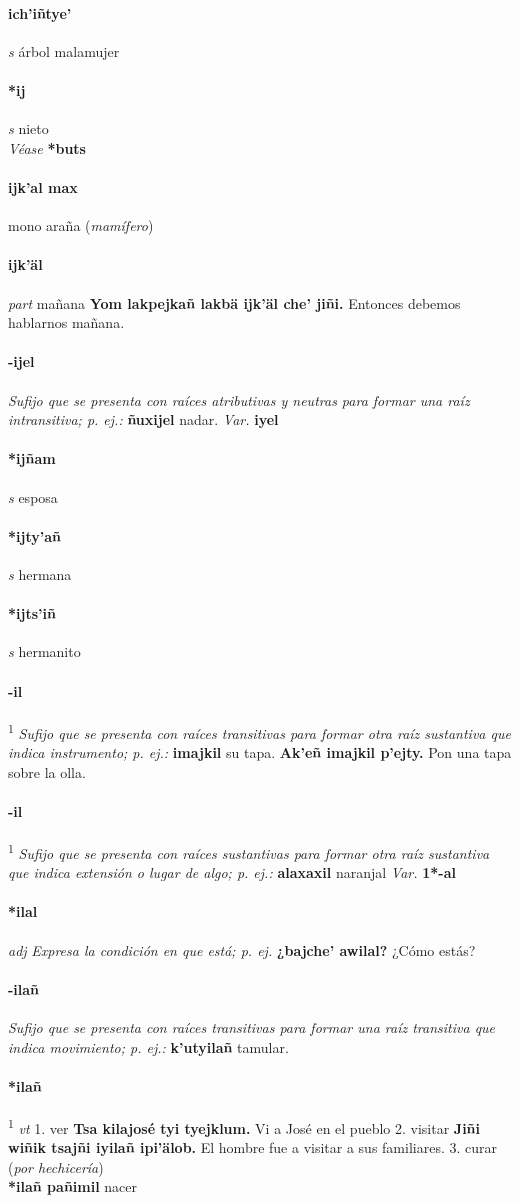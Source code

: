 \documentclass{scrbook}
\newcommand{\entry}[1]{\paragraph{#1}}
\newcommand{\onedefinition}[1]{#1.}
\newcommand{\defsuperscript}[1]{\textsuperscript{1}}
\newcommand{\nontranslationdef}[1]{\textit{#1}}
\newcommand{\partofspeech}[1]{\textit{#1}}
\newcommand{\spanishtranslation}[1]{#1}
\newcommand{\clarification}[1]{(\textit{#1})}
\newcommand{\cholexample}[1]{\textbf{#1}}
\newcommand{\exampletranslation}[1]{#1}
\newcommand{\alsosee}[1]{\\\textit{Véase} \textbf{#1}}
\newcommand{\secondaryentry}[1]{\\\textbf{#1}}
\newcommand{\secondtranslation}[1]{#1}
\newcommand{\variation}[1]{\textit{Var.} \textbf{#1}}
\begin{document}
\begin{multicols}{2}
\entry{ich'iñtye'}
\partofspeech{s}
\spanishtranslation{árbol malamujer}

\entry{*ij}
\partofspeech{s}
\spanishtranslation{nieto}
\alsosee{*buts}

\entry{ijk'al max}
\spanishtranslation{mono araña}
\clarification{mamífero}

\entry{ijk'äl}
\partofspeech{part}
\spanishtranslation{mañana}
\cholexample{Yom lakpejkañ lakbä ijk'äl che' jiñi.}
\exampletranslation{Entonces debemos hablarnos mañana.}

\entry{-ijel}
\nontranslationdef{Sufijo que se presenta con raíces atributivas y neutras para formar una raíz intransitiva; p. ej.:}
\cholexample{ñuxijel}
\exampletranslation{nadar.}
\variation{iyel}

\entry{*ijñam}
\partofspeech{s}
\spanishtranslation{esposa}

\entry{*ijty'añ}
\partofspeech{s}
\spanishtranslation{hermana}

\entry{*ijts'iñ}
\partofspeech{s}
\spanishtranslation{hermanito}

\entry{-il}
\defsuperscript{1}
\nontranslationdef{Sufijo que se presenta con raíces transitivas para formar otra raíz sustantiva que indica instrumento; p. ej.:}
\cholexample{imajkil}
\exampletranslation{su tapa.}
\cholexample{Ak'eñ imajkil p'ejty.}
\exampletranslation{Pon una tapa sobre la olla.}

\entry{-il}
\defsuperscript{2}
\nontranslationdef{Sufijo que se presenta con raíces sustantivas para formar otra raíz sustantiva que indica extensión o lugar de algo; p. ej.:}
\cholexample{alaxaxil}
\exampletranslation{naranjal}
\variation{1*-al}

\entry{*ilal}
\partofspeech{adj}
\nontranslationdef{Expresa la condición en que está; p. ej.}
\cholexample{¿bajche' awilal?}
\exampletranslation{¿Cómo estás?}

\entry{-ilañ}
\nontranslationdef{Sufijo que se presenta con raíces transitivas para formar una raíz transitiva que indica movimiento; p. ej.:}
\cholexample{k'utyilañ}
\exampletranslation{tamular.}

\entry{*ilañ}
\defsuperscript{1}
\partofspeech{vt}
\onedefinition{1}
\spanishtranslation{ver}
\cholexample{Tsa kilajosé tyi tyejklum.}
\exampletranslation{Vi a José en el pueblo}
\onedefinition{2}
\spanishtranslation{visitar}
\cholexample{Jiñi wiñik tsajñi iyilañ ipi'älob.}
\exampletranslation{El hombre fue a visitar a sus familiares.}
\onedefinition{3}
\spanishtranslation{curar}
\clarification{por hechicería}
\secondaryentry{*ilañ pañimil}
\secondtranslation{nacer}


\end{multicols}
\end{document}
